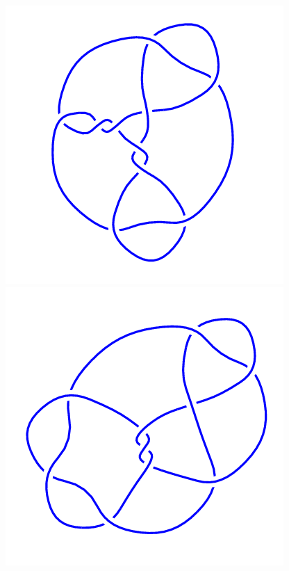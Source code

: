 \begin{figure}[H]
    \begin{minipage}[b]{.18\linewidth}
        \centering
        \includegraphics[width=\linewidth]{../data/10_67.png}
    \end{minipage}
    \begin{minipage}[b]{.18\linewidth}
        \centering
        \includegraphics[width=\linewidth]{../data/10_68.png}

\end{minipage}
\end{figure}
